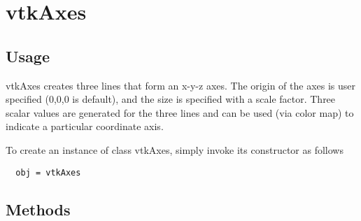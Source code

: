 \section{vtkAxes}

\subsection{Usage}

 vtkAxes creates three lines that form an x-y-z axes. The origin of the
 axes is user specified (0,0,0 is default), and the size is specified with
 a scale factor. Three scalar values are generated for the three lines and
 can be used (via color map) to indicate a particular coordinate axis.

To create an instance of class vtkAxes, simply
invoke its constructor as follows
\begin{verbatim}
  obj = vtkAxes
\end{verbatim}
\subsection{Methods}

